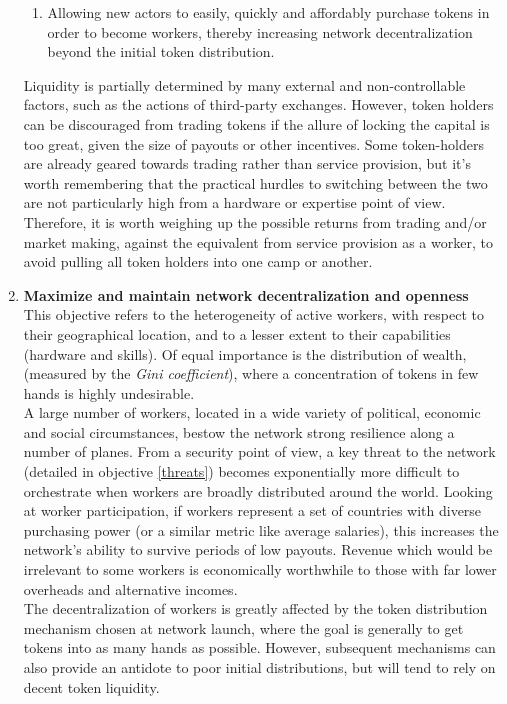 \documentclass[11pt]{amsart}
\begin{document}
\begin{enumerate}
\begin{enumerate}
   \item Allowing new actors to easily, quickly and affordably purchase tokens in order to become workers, thereby increasing network decentralization beyond the initial token distribution. 
   \end{enumerate}
   Liquidity is partially determined by many external and non-controllable factors, such as the actions of third-party exchanges. However, token holders can be discouraged from trading tokens if the allure of locking the capital is too great, given the size of payouts or other incentives. Some token-holders are already geared towards trading rather than service provision, but it's worth remembering that the practical hurdles to switching between the two are not particularly high from a hardware or expertise point of view. Therefore, it is worth weighing up the possible returns from trading and/or market making, against the equivalent from service provision as a worker, to avoid pulling all token holders into one camp or another. 
   \\
   \item \textbf{Maximize and maintain network decentralization and openness}\label{decent}
   \\
   This objective refers to the heterogeneity of active workers, with respect to their geographical location, and to a lesser extent to their capabilities (hardware and skills). Of equal importance is the distribution of wealth, (measured by the \textit{Gini coefficient}), where a concentration of tokens in few hands is highly undesirable.
   \\
   A large number of workers, located in a wide variety of political, economic and social circumstances, bestow the network strong resilience along a number of planes. From a security point of view, a key threat to the network (detailed in objective \ref{threats}) becomes exponentially more difficult to orchestrate when workers are broadly distributed around the world. Looking at worker participation, if workers represent a set of countries with diverse purchasing power (or a similar metric like average salaries), this increases the network's ability to survive periods of low payouts. Revenue which would be irrelevant to some workers is economically worthwhile to those with far lower overheads and alternative incomes. 
   \\
   The decentralization of workers is greatly affected by the token distribution mechanism chosen at network launch, where the goal is generally to get tokens into as many hands as possible. However, subsequent mechanisms can also provide an antidote to poor initial distributions, but will tend to rely on decent token liquidity.  

\end{enumerate}
\end{document}
